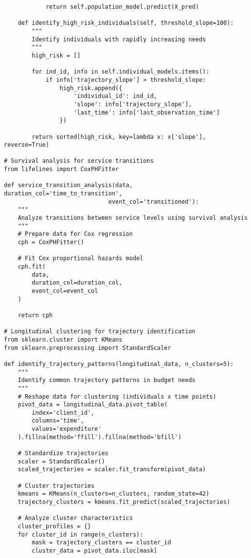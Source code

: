 \documentclass[12pt]{article}
\begin{document}
\begin{lstlisting}
            return self.population_model.predict(X_pred)
    
    def identify_high_risk_individuals(self, threshold_slope=100):
        """
        Identify individuals with rapidly increasing needs
        """
        high_risk = []
        
        for ind_id, info in self.individual_models.items():
            if info['trajectory_slope'] > threshold_slope:
                high_risk.append({
                    'individual_id': ind_id,
                    'slope': info['trajectory_slope'],
                    'last_time': info['last_observation_time']
                })
        
        return sorted(high_risk, key=lambda x: x['slope'], reverse=True)

# Survival analysis for service transitions
from lifelines import CoxPHFitter

def service_transition_analysis(data, duration_col='time_to_transition',
                              event_col='transitioned'):
    """
    Analyze transitions between service levels using survival analysis
    """
    # Prepare data for Cox regression
    cph = CoxPHFitter()
    
    # Fit Cox proportional hazards model
    cph.fit(
        data, 
        duration_col=duration_col, 
        event_col=event_col
    )
    
    return cph

# Longitudinal clustering for trajectory identification
from sklearn.cluster import KMeans
from sklearn.preprocessing import StandardScaler

def identify_trajectory_patterns(longitudinal_data, n_clusters=5):
    """
    Identify common trajectory patterns in budget needs
    """
    # Reshape data for clustering (individuals x time points)
    pivot_data = longitudinal_data.pivot_table(
        index='client_id', 
        columns='time', 
        values='expenditure'
    ).fillna(method='ffill').fillna(method='bfill')
    
    # Standardize trajectories
    scaler = StandardScaler()
    scaled_trajectories = scaler.fit_transform(pivot_data)
    
    # Cluster trajectories
    kmeans = KMeans(n_clusters=n_clusters, random_state=42)
    trajectory_clusters = kmeans.fit_predict(scaled_trajectories)
    
    # Analyze cluster characteristics
    cluster_profiles = {}
    for cluster_id in range(n_clusters):
        mask = trajectory_clusters == cluster_id
        cluster_data = pivot_data.iloc[mask]
        

\end{lstlisting}
\end{document}
